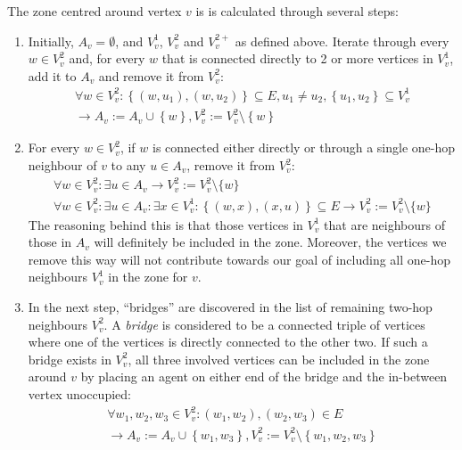 The zone centred around vertex $v$ is is calculated through several steps:
\begin{enumerate}
  \item Initially, $A_v = \emptyset$, and $V_v^1$, $V_v^2$ and $V_v^{2+}$ as defined above.
        Iterate through every $w \in V_v^2$ and, for every $w$ that is connected directly to 2 or more vertices in $V_v^1$, add it to $A_v$ and remove it from $V_v^2$:
        \begin{multline}
        \forall w \in V_v^2: \left\{\left(w, u_1 \right ), \left(w, u_2 \right )\right\} \subseteq E, u_1 \neq u_2, \left\{u_1, u_2\right\} \subseteq V_v^1 \\
        \rightarrow A_v := A_v \cup \left\{w\right\}, V_v^2 := V_v^2 \setminus \left\{w \right \}
        \end{multline}
  \item For every $w \in V_v^2$, if $w$ is connected either directly or through a single one-hop neighbour of $v$ to any $u \in A_v$, remove it from $V_v^2$:
  \begin{multline}
  \forall w \in V_v^2: \exists u \in A_v \rightarrow V_v^2 := V_v^2 \setminus \{w\}
\\ \forall w \in V_v^2: \exists u \in A_v: \exists x \in V_v^1: \left\{\left(w, x \right ), \left(x, u \right )\right\} \subseteq E\rightarrow V_v^2 := V_v^2 \setminus \{w\}
  \end{multline}
      The reasoning behind this is that those vertices in $V_v^1$ that are neighbours of those in $A_v$ will definitely be included in the zone.
      Moreover, the vertices we remove this way will not contribute towards our goal of including all one-hop neighbours $V_v^1$ in the zone for $v$.
  \item In the next step, \enquote{bridges} are discovered in the list of remaining two-hop neighbours $V_v^2$.
        A \emph{bridge} is considered to be a connected triple of vertices where one of the vertices is directly connected to the other two.
        If such a bridge exists in $V_v^2$, all three involved vertices can be included in the zone around $v$ by placing an agent on either end of the bridge and the in-between vertex unoccupied:
        \begin{multline}
        \forall w_1, w_2, w_3 \in V_v^2: \left(w_1, w_2\right ), \left(w_2, w_3 \right ) \in E \\ \rightarrow A_v := A_v \cup \left\{w_1, w_3 \right \}, V_v^2 := V_v^2 \setminus \left\{w_1,w_2,w_3\right\}
        \end{multline}

\end{enumerate}
